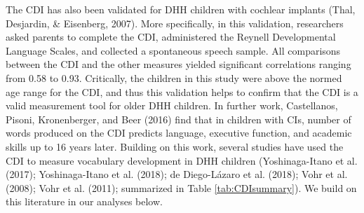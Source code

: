 \documentclass[
  english,
  man]{apa6}
\begin{document}
The CDI has also been validated for DHH children with cochlear implants (Thal, Desjardin, \& Eisenberg, 2007). More specifically, in this validation, researchers asked parents to complete the CDI, administered the Reynell Developmental Language Scales, and collected a spontaneous speech sample. All comparisons between the CDI and the other measures yielded significant correlations ranging from 0.58 to 0.93. Critically, the children in this study were above the normed age range for the CDI, and thus this validation helps to confirm that the CDI is a valid measurement tool for older DHH children. In further work, Castellanos, Pisoni, Kronenberger, and Beer (2016) find that in children with CIs, number of words produced on the CDI predicts language, executive function, and academic skills up to 16 years later. Building on this work, several studies have used the CDI to measure vocabulary development in DHH children (Yoshinaga-Itano et al. (2017); Yoshinaga-Itano et al. (2018); de Diego-Lázaro et al. (2018); Vohr et al. (2008); Vohr et al. (2011); summarized in Table \ref{tab:CDIsummary}). We build on this literature in our analyses below.

\begin{table}

\caption{\label{tab:CDIsummary}Summary of findings of CDI studies in DHH children}
\centering
{}
\end{table}
\end{document}
